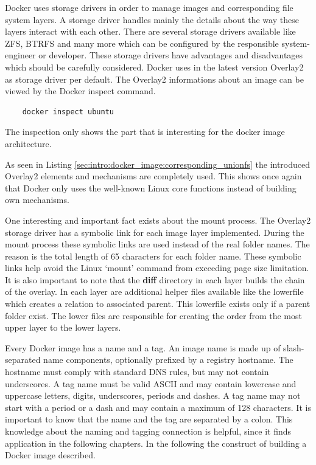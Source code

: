 Docker uses storage drivers in order to manage images and corresponding file system layers. 
A storage driver handles mainly the details about the way these layers interact with each other.
There are several storage drivers available like ZFS, BTRFS and many more which can be configured by the responsible system-engineer or developer. These storage drivers have advantages and disadvantages which should be carefully considered. Docker uses in the latest version Overlay2 as storage driver per default. The Overlay2 informations about an image can be viewed by the Docker inspect command.
\begin{lstlisting}
	docker inspect ubuntu
\end{lstlisting}
The inspection only shows the part that is interesting for the docker image architecture.

As seen in Listing \ref{sec:intro:docker_image:corresponding_unionfs} the introduced Overlay2 elements and mechanisms are completely used.
This shows once again that Docker only uses the well-known Linux core functions instead of building own mechanisms.

One interesting and important fact exists about the mount process. The Overlay2 storage driver has a symbolic link for each image layer implemented. During the mount process these symbolic links are used instead of the real folder names. The reason is the total length of 65 characters for each folder name. These symbolic links help avoid the Linux ‘mount’ command from exceeding page size limitation.
It is also important to note that the \textbf{diff} directory in each layer builds the chain of the overlay. In each layer are additional helper files available like the lowerfile which creates a relation to associated parent. This lowerfile exists only if a parent folder exist.
The lower files are responsible for creating the order from the most upper layer to the lower layers.

Every Docker image has a name and a tag. An image name is made up of slash-separated name components, optionally prefixed by a registry hostname. The hostname must comply with standard DNS rules, but may not contain underscores. A tag name must be valid ASCII and may contain lowercase and uppercase letters, digits, underscores, periods and dashes. A tag name may not start with a period or a dash and may contain a maximum of 128 characters.
It is important to know that the name and the tag are separated by a colon.
This knowledge about the naming and tagging connection is helpful, since it finds application in the following chapters. In the following the construct of building a Docker image described.

